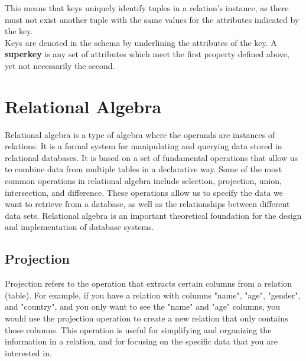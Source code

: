 \documentclass{report}
\begin{document}
     \par This means that keys uniquely identify tuples in a relation's instance, as there must not exist another tuple with the same values for the attributes indicated by the key.\\

     Keys are denoted in the schema by underlining the attributes of the key. A \textbf{superkey} is any set of attributes which meet the first property defined above, yet not necessarily the second.

\newpage

    \section{Relational Algebra}
        Relational algebra is a type of algebra where the operands are instances of relations. It is a formal system for manipulating and querying data stored in relational databases. It is based on a set of fundamental operations that allow us to combine data from multiple tables in a declarative way. Some of the most common operations in relational algebra include selection, projection, union, intersection, and difference. These operations allow us to specify the data we want to retrieve from a database, as well as the relationships between different data sets. Relational algebra is an important theoretical foundation for the design and implementation of database systems.

        \subsection{Projection}
        Projection refers to the operation that extracts certain columns from a relation (table). For example, if you have a relation with columns "name", "age", "gender", and "country", and you only want to see the "name" and "age" columns, you would use the projection operation to create a new relation that only contains those columns. This operation is useful for simplifying and organizing the information in a relation, and for focusing on the specific data that you are interested in. \\

\end{document}
